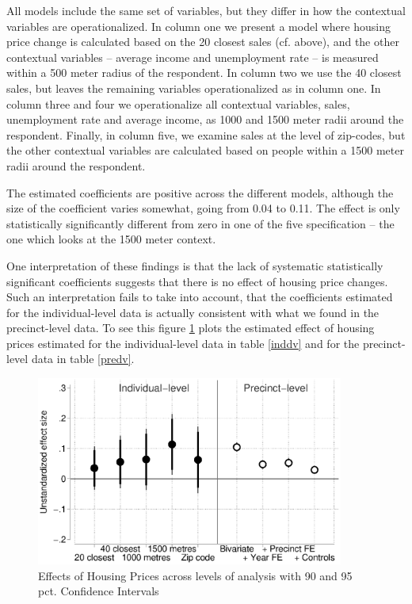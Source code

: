 \documentclass[12pt,a4paper]{article}
\begin{document}
All models include the same set of variables, but they differ in how the contextual variables are operationalized. In column one we present a model where housing price change is calculated based on the 20 closest sales (cf. above), and the other contextual variables -- average income and unemployment rate -- is measured within a 500 meter radius of the respondent. In column two we use the 40 closest sales, but leaves the remaining variables operationalized as in column one. In column three and four we operationalize all contextual variables, sales, unemployment rate and average income, as 1000 and 1500 meter radii around the respondent. Finally, in column five, we examine sales at the level of zip-codes, but the other contextual variables are calculated based on people within a 1500 meter radii around the respondent.



The estimated coefficients are positive across the different models, although the size of the coefficient varies somewhat, going from 0.04 to 0.11. The effect is only statistically significantly different from zero in one of the five specification -- the one which looks at the 1500 meter context. 

One interpretation of these findings is that the lack of systematic statistically significant coefficients suggests that there is no effect of housing price changes. Such an interpretation fails to take into account, that the coefficients  estimated for the individual-level data is actually consistent with what we found in the precinct-level data. To see this figure \ref{comparison} plots the estimated effect of housing prices estimated for the individual-level data in table \ref{inddv}  and for the precinct-level data in table \ref{predv}.

\begin{figure}[htbp!]
	\includegraphics[width=0.9\textwidth]{../figures/comparison.eps}
	\centering
	\caption{Effects of Housing Prices across levels of analysis with 90  and 95 pct. Confidence Intervals}\label{comparison}
\end{figure}
\end{document}
